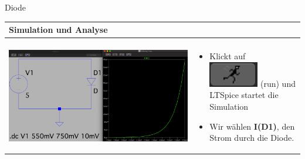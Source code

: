      \begin{frame}[t]{Diode}
    
      \begin{spacing}{0.9} \begin{tiny}
      \begin{table}[h!]
        \begin{tabular}{p{5cm} p{5cm}}
          \hline
          \textbf{Simulation und Analyse} & \\
          \hline \\
          \begin{minipage}{.5\textwidth}
            \includegraphics[width=\linewidth]{pictures/analysis_2.png}
          \end{minipage} 
          & 
          \begin{minipage}{.5\textwidth}
          \begin{itemize}
            \item Klickt auf \includegraphics[scale=0.3]{pictures/run.png} (run) und LTSpice startet die Simulation
          \item Wir wählen \textbf{I(D1)}, den Strom durch die Diode.
          \end{itemize}
          \end{minipage} 
          \\
        \end{tabular}
      \end{table}
    \end{tiny} \end{spacing}
    

\end{frame}
